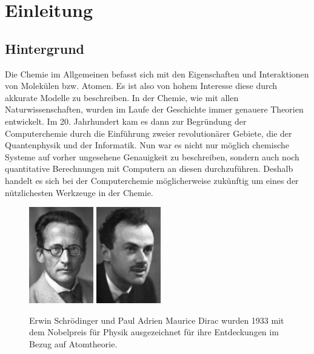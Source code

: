 \chapter{Einleitung}
\section{Hintergrund}
Die Chemie im Allgemeinen befasst sich mit den Eigenschaften und Interaktionen
von Molekülen bzw. Atomen. Es ist also von hohem Interesse diese
durch akkurate Modelle zu beschreiben. In der Chemie, wie mit allen
Naturwissenschaften, wurden im Laufe der Geschichte immer genauere Theorien entwickelt.
Im 20. Jahrhundert kam es dann zur Begründung der Computerchemie durch die Einführung zweier 
revolutionärer Gebiete, die der Quantenphysik und der Informatik.
Nun war es nicht nur möglich chemische Systeme auf vorher ungesehene Genauigkeit zu beschreiben,
sondern auch noch quantitative Berechnungen mit Computern an diesen durchzuführen.
Deshalb handelt es sich bei der Computerchemie möglicherweise zukünftig
um eines der nützlichesten Werkzeuge in der Chemie.

\begin{figure}[h]
    \begin{center}
    \includegraphics[width=0.25\textwidth]{res/schrodinger.jpg}
    \includegraphics[width=0.25\textwidth]{res/dirac.jpg}
\end{center}
    \caption{Erwin Schrödinger und Paul Adrien Maurice Dirac wurden 1933 mit dem Nobelpreis
    für Physik ausgezeichnet für ihre Entdeckungen im Bezug auf Atomtheorie. \cite{nobel_1933}}
\end{figure}

